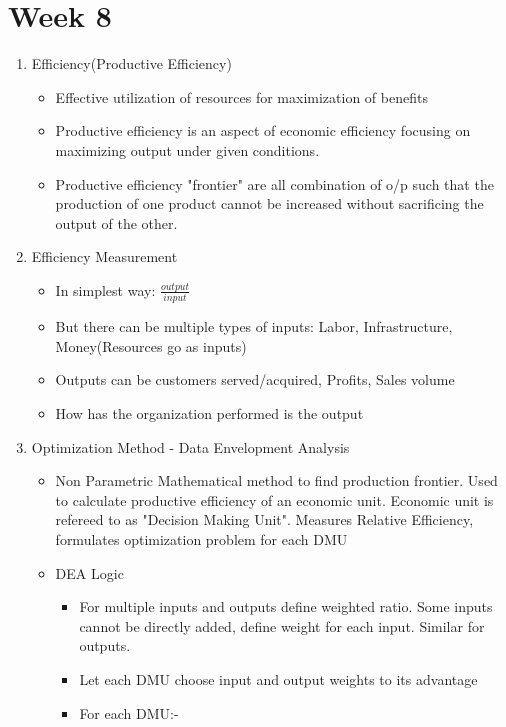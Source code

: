 \documentclass[a4paper]{article}
\begin{document}
 \section{Week 8}
 \begin{enumerate}
     \item Efficiency(Productive Efficiency)
     \begin{itemize}
         \item Effective utilization of resources for maximization of benefits
         \item Productive efficiency is an aspect of economic efficiency focusing on maximizing output under given conditions.
         \item Productive efficiency "frontier" are all combination of o/p such that the production of one product cannot be increased without sacrificing the output of the other.
     \end{itemize}
     \item Efficiency Measurement
     \begin{itemize}
         \item In simplest way: $\frac{output}{input}$
         \item But there can be multiple types of inputs: Labor, Infrastructure, Money(Resources go as inputs)
         \item Outputs can be customers served/acquired, Profits, Sales volume
         \item How has the organization performed is the output\\
     \end{itemize}
     \item Optimization Method - Data Envelopment Analysis
     \begin{itemize}
         \item Non Parametric Mathematical method to find production frontier. Used to calculate productive efficiency of an economic unit. Economic unit is refereed to as "Decision Making Unit". Measures Relative Efficiency, formulates optimization problem for each DMU
         \item DEA Logic
         \begin{itemize}
             \item For multiple inputs and outputs define weighted ratio. Some inputs cannot be directly added, define weight for each input. Similar for outputs.
             \item Let each DMU choose input and output weights to its advantage
             \item For each DMU:-

\end{itemize}
\end{itemize}
\end{enumerate}
\end{document}
